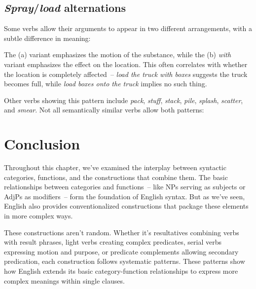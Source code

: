 \subsection{\textit{Spray}/\textit{load} alternations}

Some verbs allow their arguments to appear in two different arrangements, with a subtle difference in meaning:

\ea\label{ex:spray-load}
   \z
\ex
   \z
\z

The (a) variant emphasizes the motion of the substance, while the (b) \textit{with} variant  emphasizes the effect on the location. This often correlates with whether the location is completely affected~-- \textit{load the truck with boxes} suggests the truck becomes full, while \textit{load boxes onto the truck} implies no such thing.

Other verbs showing this pattern include \textit{pack}, \textit{stuff}, \textit{stack}, \textit{pile}, \textit{splash}, \textit{scatter}, and \textit{smear}. Not all semantically similar verbs allow both patterns:

\ea\label{ex:spray-load-gaps}
   \z
\z

\section{Conclusion}

Throughout this chapter, we've examined the interplay between syntactic categories, functions, and the constructions that combine them. The basic relationships between categories and functions~-- like NPs serving as subjects or AdjPs as modifiers~-- form the foundation of English syntax. But as we've seen, English also provides conventionalized constructions that package these elements in more complex ways.

These constructions aren't random. Whether it's resultatives combining verbs with result phrases, light verbs creating complex predicates, serial verbs expressing motion and purpose, or predicate complements allowing secondary predication, each construction follows systematic patterns. These patterns show how English extends its basic category-function relationships to express more complex meanings within single clauses.

